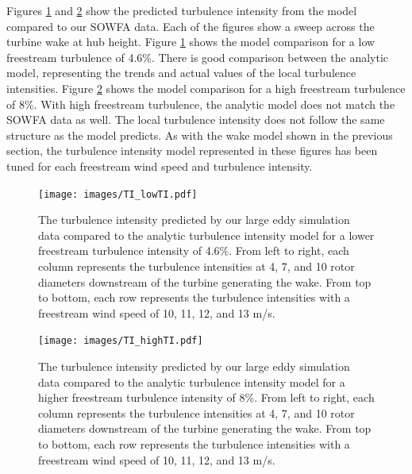 \documentclass[11pt,letterpaper]{article}
\begin{document}
Figures \ref{TI_lowTI} and \ref{TI_highTI} show the predicted turbulence intensity from the model compared to our SOWFA data. Each of the figures show a sweep across the turbine wake at hub height. Figure \ref{TI_lowTI} shows the model comparison for a low freestream turbulence of 4.6\%. There is good comparison between the analytic model, representing the trends and actual values of the local turbulence intensities. Figure \ref{TI_highTI} shows the model comparison for a high freestream turbulence of 8\%. With high freestream turbulence, the analytic model does not match the SOWFA data as well. The local turbulence intensity does not follow the same structure as the model predicts. As with the wake model shown in the previous section, the turbulence intensity model represented in these figures has been tuned for each freestream wind speed and turbulence intensity.
% 
\begin{figure}
    \centering
    \texttt{[image: images/TI\_lowTI.pdf]}
    \caption{The turbulence intensity predicted by our large eddy simulation data compared to the analytic turbulence intensity model for a lower freestream turbulence intensity of 4.6\%. From left to right, each column represents the turbulence intensities at 4, 7, and 10 rotor diameters downstream of the turbine generating the wake. From top to bottom, each row represents the turbulence intensities with a freestream wind speed of 10, 11, 12, and 13 m/s.}
    \label{TI_lowTI}
\end{figure}
% 
\begin{figure}
    \centering
    \texttt{[image: images/TI\_highTI.pdf]}
    \caption{The turbulence intensity predicted by our large eddy simulation data compared to the analytic turbulence intensity model for a higher freestream turbulence intensity of 8\%. From left to right, each column represents the turbulence intensities at 4, 7, and 10 rotor diameters downstream of the turbine generating the wake. From top to bottom, each row represents the turbulence intensities with a freestream wind speed of 10, 11, 12, and 13 m/s.}
    \label{TI_highTI}
\end{figure}
\end{document}
